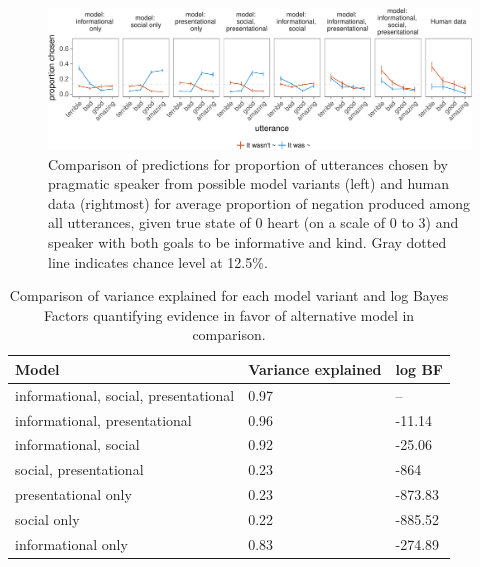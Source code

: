 \documentclass[9pt,twocolumn,twoside,lineno]{main_class_file}
\begin{document}
\begin{figure}[!h]
\includegraphics[width=\textwidth]{fig/comparison-1} \caption{Comparison of predictions for proportion of utterances chosen by pragmatic speaker from possible model variants (left) and human data (rightmost) for average proportion of negation produced among all utterances, given true state of 0 heart (on a scale of 0 to 3) and speaker with both goals to be informative and kind. Gray dotted line indicates chance level at 12.5\%.}\label{fig:comparison}
\end{figure}

\begin{table}[tbp]
\begin{center}
\begin{threeparttable}
\caption{\label{tab:comparisonTable}Comparison of variance explained for each model variant and log Bayes Factors quantifying evidence in favor of alternative model in comparison.}
\begin{tabular}{lll}
\toprule
Model & \multicolumn{1}{c}{Variance
explained} & \multicolumn{1}{c}{log BF}\\
\midrule
informational,
social,
presentational & 0.97 & --\\
informational,
presentational & 0.96 & -11.14\\
informational,
social & 0.92 & -25.06\\
social,
presentational & 0.23 & -864\\
presentational
only & 0.23 & -873.83\\
social only & 0.22 & -885.52\\
informational
only & 0.83 & -274.89\\
\bottomrule
\end{tabular}
\end{threeparttable}
\end{center}
\end{table}
\end{document}
